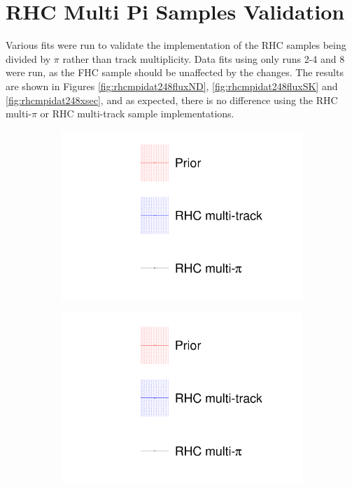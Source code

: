 \chapter{RHC Multi Pi Samples Validation}\label{appendix:rhcmpi}

Various fits were run to validate the implementation of the RHC samples being divided by $\pi$ rather than track multiplicity. Data fits using only runs 2-4 and 8 were run, as the FHC sample should be unaffected by the changes. The results are shown in Figures \ref{fig:rhcmpidat248fluxND}, \ref{fig:rhcmpidat248fluxSK} and \ref{fig:rhcmpidat248xsec}, and as expected, there is no difference using the RHC multi-$\pi$ or RHC multi-track sample implementations. 

\begin{figure}[t]
\centering
\begin{subfigure}{0.3\textwidth}
  \centering
  \includegraphics[width=1.0\linewidth, trim={5mm  130mm 0mm 10mm}, clip]{figs/rhcmpdat248_leg}	
\end{subfigure}
\begin{subfigure}{0.3\textwidth}
  \centering
  \includegraphics[width=1.0\linewidth, trim={5mm  0mm 0mm 70mm}, clip]{figs/rhcmpdat248_leg}	

\end{subfigure}
\end{figure}
